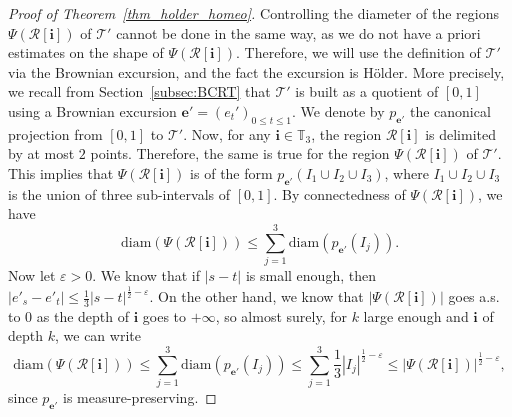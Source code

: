 \documentclass[JEP,XML,SOM,Unicode,NoFloatCountersInSection,published]{cedram}
\newcommand{\Tt}{\mathcal{T}}
\newcommand{\Rr}{\mathcal{R}}
\newcommand{\ii}{\mathbf{i}}
\newcommand{\diam}{\mathrm{diam}}
\let\eps\varepsilon
\theoremstyle{plain}
\theoremstyle{definition}
\begin{document}
\begin{proof}[Proof of Theorem~\ref{thm_holder_homeo}]
Controlling the diameter of the regions $\Psi \left( \Rr[\ii]\right)$ of $\Tt'$ cannot be done in the same way, as we do not have a priori estimates on the shape of $\Psi \left( \Rr[\ii]\right)$. Therefore, we will use the definition of $\Tt'$ via the Brownian excursion, and the fact the excursion is Hölder.
More precisely, we recall from Section~\ref{subsec:BCRT} that $\Tt'$ is built as a quotient of $[0,1]$ using a Brownian excursion $\mathbf{e}'=\left( e_t' \right)_{0 \leq t \leq 1}$. We denote by $p_{\mathbf{e}'}$ the canonical projection from $[0,1]$ to $\Tt'$.
Now, for any $\ii \in \mathbb{T}_3$, the region $\Rr[\ii]$ is delimited by at most $2$ points.
Therefore, the same is true for the region $\Psi \left( \Rr[\ii] \right)$ of $\Tt'$.
This implies that $\Psi \left( \Rr[\ii] \right)$ is of the form $p_{\mathbf{e}'}(I_1 \cup I_2 \cup I_3)$, where $I_1 \cup I_2 \cup I_3$ is the union of three sub-intervals of $[0,1]$.
By connectedness of $\Psi \left( \Rr[\ii] \right)$, we have
\[ \diam \left( \Psi \left( \Rr[\ii] \right) \right) \leq \sum_{j=1}^3 \diam \left( p_{\mathbf{e'}}(I_j) \right). \]
Now let $\eps>0$. We know that if $|s-t|$ is small enough, then $|e'_s-e'_t| \leq \frac13 |s-t|^{\frac12-\eps}$. On the other hand, we know that $\left| \Psi \left( \Rr[\ii] \right)\right| $ goes a.s. to $0$ as the depth of $\ii$ goes to $+\infty$, so almost surely, for $k$ large enough and $\ii$ of depth $k$, we can write
\begin{equation}
\label{eq:diam of region is smaller than mass to some power}
\diam \left( \Psi \left( \Rr[\ii] \right) \right) \leq \sum_{j=1}^3 \diam \left( p_{\mathbf{e'}}(I_j) \right) \leq \sum_{j=1}^3 \frac13 |I_j|^{\frac12-\eps} \leq \left| \Psi \left( \Rr[\ii] \right) \right|^{\frac12-\eps},
\end{equation}
since $p_{\mathbf{e}'}$ is measure-preserving.


\end{proof}
\end{document}
